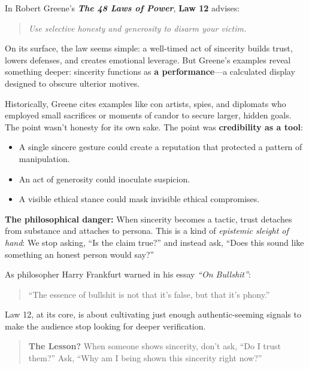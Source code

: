 \begin{tcolorbox}[colback=blue!5!white, colframe=blue!50!black, breakable,
  title={Philosophical Sidebar: Law 12 — The Theater of Sincerity}]

In Robert Greene’s \textbf{\textit{The 48 Laws of Power}}, \textbf{Law 12} advises:  

\begin{quote}
\textit{Use selective honesty and generosity to disarm your victim.}
\end{quote}

On its surface, the law seems simple: a well-timed act of sincerity builds trust, lowers defenses, and creates emotional leverage.  
But Greene’s examples reveal something deeper: sincerity functions as \textbf{a performance}—a calculated display designed to obscure ulterior motives.

\medskip

Historically, Greene cites examples like con artists, spies, and diplomats who employed small sacrifices or moments of candor to secure larger, hidden goals. The point wasn’t honesty for its own sake. The point was \textbf{credibility as a tool}:  

\medskip

\begin{itemize}
    \item A single sincere gesture could create a reputation that protected a pattern of manipulation.
    \item An act of generosity could inoculate suspicion.
    \item A visible ethical stance could mask invisible ethical compromises.
\end{itemize}

\medskip

\textbf{The philosophical danger:}  When sincerity becomes a tactic, trust detaches from substance and attaches to persona.  This is a kind of \textit{epistemic sleight of hand}:  We stop asking, “Is the claim true?” and instead ask, “Does this sound like something an honest person would say?”

\medskip

As philosopher Harry Frankfurt warned in his essay \textit{“On Bullshit”}:  

\begin{quote}
“The essence of bullshit is not that it’s false, but that it’s phony.”  
\end{quote}

Law 12, at its core, is about cultivating just enough authentic-seeming signals to make the audience stop looking for deeper verification.

\medskip

\begin{quote}
\textbf{The Lesson?}  When someone shows sincerity, don’t ask, “Do I trust them?”  Ask, “Why am I being shown this sincerity right now?”  
\end{quote}

\end{tcolorbox}


